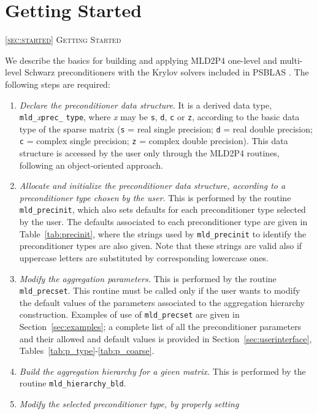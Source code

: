 \section{Getting Started\label{sec:started}}
         {\textsc{\ref{sec:started} Getting Started}}

We describe the basics for building and applying MLD2P4 one-level and multi-level
Schwarz preconditioners with the Krylov solvers included in PSBLAS \cite{PSBLASGUIDE}.
The following steps are required:
\begin{enumerate} 
\item \emph{Declare the preconditioner data structure}. It is a derived data type,
  \verb|mld_|\-\emph{x}\verb|prec_| \verb|type|, where \emph{x} may be \verb|s|, \verb|d|, \verb|c|
	or \verb|z|, according to the basic data type of the sparse matrix
	(\verb|s| = real single precision; \verb|d| = real double precision;
	\verb|c| = complex single precision; \verb|z| = complex double precision).
	This data structure is accessed by the user only through the MLD2P4 routines,
	following an object-oriented approach.
\item \emph{Allocate and initialize the preconditioner data structure, according to
	a preconditioner type chosen by the user}. This is performed by the routine
	\verb|mld_precinit|, which also sets defaults for each preconditioner
	type selected by the user. The defaults associated to each preconditioner
	type are given in Table~\ref{tab:precinit}, where the strings used by
	\verb|mld_precinit| to identify the preconditioner types are also given.
	Note that these strings are valid also if uppercase letters are substituted by
	corresponding lowercase ones.
\item \emph{Modify the aggregation  parameters.} This is performed by
  the routine \verb|mld_precset|. 
  This routine must be called only if the user wants to modify the default values
  of the parameters associated to the aggregation hierarchy construction.
  Examples of use of \verb|mld_precset| are given in
  Section~\ref{sec:examples}; a complete list of all the
  preconditioner parameters and their allowed and default values is provided in 
  Section~\ref{sec:userinterface}, Tables~\ref{tab:p_type}-\ref{tab:p_coarse}. 
\item \emph{Build the aggregation hierarchy for a given matrix.} This is performed by
  the routine \verb|mld_hierarchy_bld|.
\item \emph{Modify the selected preconditioner type, by properly setting
}
\end{enumerate}
